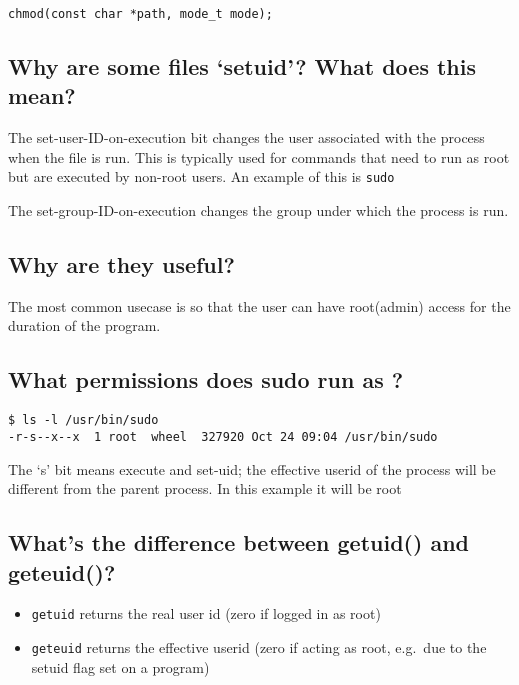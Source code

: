 \texttt{chmod(const\ char\ *path,\ mode\_t\ mode);}

\subsection{\texorpdfstring{Why are some files `setuid'? What does this
mean?}{Why are some files setuid? What does this mean?}}\label{why-are-some-files-setuid-what-does-this-mean}

The set-user-ID-on-execution bit changes the user associated with the
process when the file is run. This is typically used for commands that
need to run as root but are executed by non-root users. An example of
this is \texttt{sudo}

The set-group-ID-on-execution changes the group under which the process
is run.

\subsection{Why are they useful?}\label{why-are-they-useful}

The most common usecase is so that the user can have root(admin) access
for the duration of the program.

\subsection{What permissions does sudo run as
?}\label{what-permissions-does-sudo-run-as}

\begin{verbatim}
$ ls -l /usr/bin/sudo
-r-s--x--x  1 root  wheel  327920 Oct 24 09:04 /usr/bin/sudo
\end{verbatim}

The `s' bit means execute and set-uid; the effective userid of the
process will be different from the parent process. In this example it
will be root

\subsection{What's the difference between getuid() and
geteuid()?}\label{whats-the-difference-between-getuid-and-geteuid}

\begin{itemize}
\tightlist
\item
  \texttt{getuid} returns the real user id (zero if logged in as root)
\item
  \texttt{geteuid} returns the effective userid (zero if acting as root,
  e.g.~due to the setuid flag set on a program)
\end{itemize}

